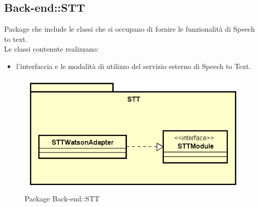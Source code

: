 \subsection{Back-end::STT}
Package che include le classi che si occupano di fornire le funzionalità di Speech to text.\\ Le classi contenute realizzano: \begin{itemize} \item l'interfaccia e le modalità di utilizzo del servizio esterno di Speech to Text. \end{itemize}
\begin{figure}[h] \centering \includegraphics[width=\textwidth,height=\textheight,keepaspectratio]{images/diagrams/back-end/Official_Backend_0304/STT.png}
	\caption{Package Back-end::STT}
\end{figure}
\newpage

